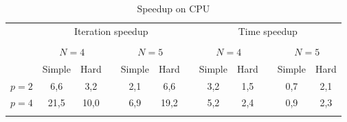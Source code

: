\documentclass{svproc}
\begin{document}
\begin{table}[t]
                \caption{Speedup on CPU}
                \label{table:average_MMAS_CPU}
                \center
                \begin{tabular}{lccccccccccc}
																	 & \multicolumn{5}{c}{ Iteration speedup} & & \multicolumn{5}{c}{ Time speedup}\\
                               \noalign{\smallskip} \cline{2-6} \cline{8-12}  \\
                                   & \multicolumn{2}{c}{ $N=4$ } & & \multicolumn{2}{c}{$N=5$} &  & \multicolumn{2}{c}{ $N=4$ } & & \multicolumn{2}{c}{$N=5$} \\
                               \noalign{\smallskip} \cline{2-3} \cline{5-6}  \cline{8-9} \cline{11-12} \noalign{\smallskip}
                               & Simple & Hard & & Simple & Hard &  & Simple & Hard & & Simple & Hard  \\
                               \noalign{\smallskip} \hline \noalign{\smallskip}                               
                               $p=2$&    6,6  & 3,2   &   & 2,1  & 6,6  &   & 3,2 & 1,5 &   & 0,7 & 2,1 \\
                               $p=4$&    21,5 &  10,0 &   & 6,9  & 19,2 &   & 5,2 & 2,4 &   & 0,9 & 2,3 \\
                               \noalign{\smallskip}\hline
                \end{tabular}
\end{table}

   
   
\end{document}
